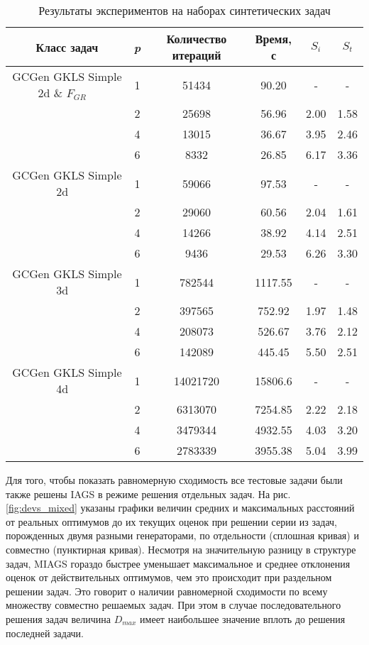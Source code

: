 \begin{table}
  \centering
  \caption{Результаты экспериментов на наборах синтетических задач}
  \label{tab:speedup}
  \begin{tabular}{c|c|cccc}
    Класс задач & \textit{p} & Количество итераций & Время, с & \(S_i\) & \(S_t\)   \\
    \hline
    GCGen GKLS Simple 2d \& \(F_{GR}\) \
      & 1 & 51434 & 90.20 & -    & - \\
      & 2 & 25698 & 56.96 & 2.00 & 1.58 \\
      & 4 & 13015 & 36.67 & 3.95 & 2.46 \\
      & 6 & 8332  & 26.85 & 6.17 & 3.36 \\
    \hline
    GCGen GKLS Simple 2d \
      & 1 & 59066 & 97.53 & -    & - \\
      & 2 & 29060 & 60.56 & 2.04 & 1.61 \\
      & 4 & 14266 & 38.92 & 4.14 & 2.51 \\
      & 6 & 9436  & 29.53 & 6.26 & 3.30 \\
    \hline
    GCGen GKLS Simple 3d \
      & 1 & 782544 & 1117.55 & -    & - \\
      & 2 & 397565 & 752.92  & 1.97 & 1.48 \\
      & 4 & 208073 & 526.67  & 3.76 & 2.12 \\
      & 6 & 142089 & 445.45  & 5.50 & 2.51 \\
    \hline
    GCGen GKLS Simple 4d \
      & 1 & 14021720 & 15806.6 & -    & - \\
      & 2 & 6313070 & 7254.85  & 2.22 & 2.18 \\
      & 4 & 3479344 & 4932.55  & 4.03 & 3.20 \\
      & 6 & 2783339 & 3955.38  & 5.04 & 3.99 \\
    \hline
  \end{tabular}
\end{table}

Для того, чтобы показать равномерную сходимость все тестовые задачи были также решены IAGS
в режиме решения отдельных задач. На рис. \ref{fig:devs_mixed} указаны графики величин
средних и максимальных расстояний от реальных оптимумов до их текущих оценок при решении
серии из задач, порожденных двумя разными генераторами, по отдельности (сплошная кривая) и совместно (пунктирная кривая).
Несмотря на значительную разницу в структуре задач, MIAGS
гораздо быстрее уменьшает максимальное и среднее отклонения оценок от действительных оптимумов, чем это происходит при раздельном решении задач.
Это говорит о наличии равномерной сходимости по всему множеству совместно решаемых задач.
При этом в случае последовательного решения задач величина \(D_{max}\) имеет наибольшее значение вплоть
до решения последней задачи.

